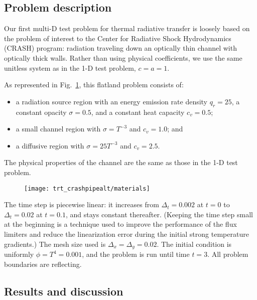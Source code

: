 \subsection{Problem description}

Our first multi-D test problem for thermal radiative transfer is loosely based
on the problem of interest to the Center for Radiative Shock Hydrodynamics
(CRASH) program: radiation traveling down an optically thin channel with
optically thick walls. Rather than using physical coefficients, we use the same
unitless system as in the 1-D test problem, $c=a=1$.

As represented in Fig.~\ref{fig:crashaltMaterials}, this flatland problem
consists of:
\begin{itemize}
  \item a radiation source region with an energy emission rate density $q_r=25$, 
    a constant opacity $\sigma=0.5$, and a constant heat capacity $c_v=0.5$;
  \item a small channel region with $\sigma = T^{-3}$ and $c_v=1.0$; and
  \item a diffusive region with $\sigma = 25 T^{-3}$ and $c_v=2.5$.
\end{itemize}
The physical properties of the channel are the same as those in the 1-D test
problem.

\begin{figure}[htb!]
  \centering
  \texttt{[image: trt\_crashpipealt/materials]}
  \label{fig:crashaltMaterials}
\end{figure}

The time step is piecewise linear: it increases from $\Delta_t=0.002$ at $t=0$
to $\Delta_t=0.02$ at $t=0.1$, and stays constant thereafter. (Keeping the
time step small at the beginning is a technique used to improve the
performance of the flux limiters and reduce the linearization error during the
initial strong temperature gradients.) The mesh size used
is $\Delta_x=\Delta_y=0.02$. The initial condition is uniformly $\phi = T^4 = 0.001$, and
the problem is run until time $t=3$. All problem boundaries are reflecting.

\subsection{Results and discussion}

